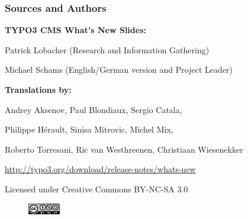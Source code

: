 \begin{frame}[fragile]
	\frametitle{Sources and Authors}

	\centerline{\textbf{TYPO3 CMS What's New Slides:}}
	\centerline{Patrick Lobacher (Research and Information Gathering)}
	\centerline{Michael Schams (English/German version and Project Leader)}

	\begin{center}
		\centerline{\textbf{Translations by:}}
		\centerline{Andrey Aksenov, Paul Blondiaux, Sergio Catala,}
		\centerline{Philippe Hérault, Sinisa Mitrovic, Michel Mix,}
		\centerline{Roberto Torresani, Ric van Westhreenen, Christiaan Wiesenekker}
	\end{center}

	\smaller\begin{center}\url{http://typo3.org/download/release-notes/whats-new}\end{center}\normalsize

	\smaller\begin{center}Licensed under Creative Commons BY-NC-SA 3.0\end{center}\normalsize
	\begin{figure}\vspace*{-0.2cm}
		\includegraphics[width=1.4cm]{Images/SourcesAndAuthors/CreativeCommons-BY-NC-SA.png}
	\end{figure}

\end{frame}


